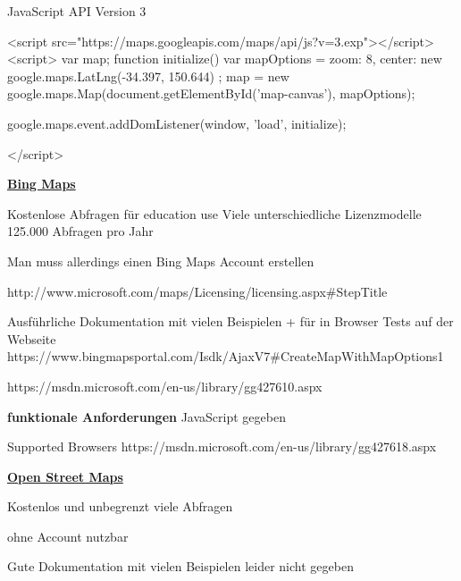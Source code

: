 JavaScript API Version 3

<script src="https://maps.googleapis.com/maps/api/js?v=3.exp"></script>
    <script>
var map;
function initialize() {
  var mapOptions = {
    zoom: 8,
    center: new google.maps.LatLng(-34.397, 150.644)
  };
  map = new google.maps.Map(document.getElementById('map-canvas'),
      mapOptions);
}

google.maps.event.addDomListener(window, 'load', initialize);

    </script>





\textbf{\underline{Bing Maps}}

Kostenlose Abfragen für education use
Viele unterschiedliche Lizenzmodelle 
125.000 Abfragen pro Jahr

Man muss allerdings einen Bing Maps Account erstellen

http://www.microsoft.com/maps/Licensing/licensing.aspx\#StepTitle


Ausführliche Dokumentation mit vielen Beispielen
+ für in Browser Tests auf der Webseite
https://www.bingmapsportal.com/Isdk/AjaxV7\#CreateMapWithMapOptions1

https://msdn.microsoft.com/en-us/library/gg427610.aspx

\textbf{funktionale Anforderungen}
JavaScript gegeben

Supported Browsers
https://msdn.microsoft.com/en-us/library/gg427618.aspx


\textbf{\underline{Open Street Maps}}

Kostenlos und unbegrenzt viele Abfragen

ohne Account nutzbar

Gute Dokumentation mit vielen Beispielen leider nicht gegeben




